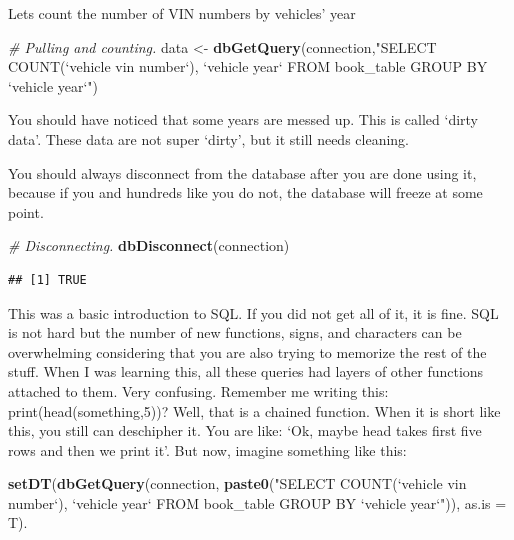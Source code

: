 \documentclass[]{book}
\newenvironment{Shaded}{\begin{snugshade}}{\end{snugshade}}
\newcommand{\CommentTok}[1]{\textcolor[rgb]{0.56,0.35,0.01}{\textit{#1}}}
\newcommand{\DataTypeTok}[1]{\textcolor[rgb]{0.13,0.29,0.53}{#1}}
\newcommand{\KeywordTok}[1]{\textcolor[rgb]{0.13,0.29,0.53}{\textbf{#1}}}
\newcommand{\NormalTok}[1]{#1}
\newcommand{\StringTok}[1]{\textcolor[rgb]{0.31,0.60,0.02}{#1}}
\begin{document}
Lets count the number of VIN numbers by vehicles' year

\begin{Shaded}
\begin{Highlighting}[]
\CommentTok{# Pulling and counting.}
\NormalTok{data <-}\StringTok{ }\KeywordTok{dbGetQuery}\NormalTok{(connection,}\StringTok{"SELECT }
\StringTok{                   COUNT(`vehicle vin number`),}
\StringTok{                   `vehicle year`}
\StringTok{                   FROM book_table}
\StringTok{                   GROUP BY `vehicle year`"}\NormalTok{)}
\end{Highlighting}
\end{Shaded}

You should have noticed that some years are messed up. This is called `dirty data'. These data are not super `dirty', but it still needs cleaning.

You should always disconnect from the database after you are done using it, because if you and hundreds like you do not, the database will freeze at some point.

\begin{Shaded}
\begin{Highlighting}[]
\CommentTok{# Disconnecting.}
\KeywordTok{dbDisconnect}\NormalTok{(connection)}
\end{Highlighting}
\end{Shaded}

\begin{verbatim}
## [1] TRUE
\end{verbatim}

This was a basic introduction to SQL. If you did not get all of it, it is fine. SQL is not hard but the number of new functions, signs, and characters can be overwhelming considering that you are also trying to memorize the rest of the stuff. When I was learning this, all these queries had layers of other functions attached to them. Very confusing. Remember me writing this: print(head(something,5))?
Well, that is a chained function. When it is short like this, you still can deschipher it. You are like: `Ok, maybe head takes first five rows and then we print it'. But now, imagine something like this:

\begin{Shaded}
\begin{Highlighting}[]
\KeywordTok{setDT}\NormalTok{(}\KeywordTok{dbGetQuery}\NormalTok{(connection, }\KeywordTok{paste0}\NormalTok{(}\StringTok{"SELECT }
\StringTok{                                    COUNT(`vehicle vin number`),}
\StringTok{                                    `vehicle year`}
\StringTok{                                    FROM book_table }
\StringTok{                                    GROUP BY `vehicle year`"}\NormalTok{)), }
      \DataTypeTok{as.is =}\NormalTok{ T). }
\end{Highlighting}
\end{Shaded}
\end{document}
